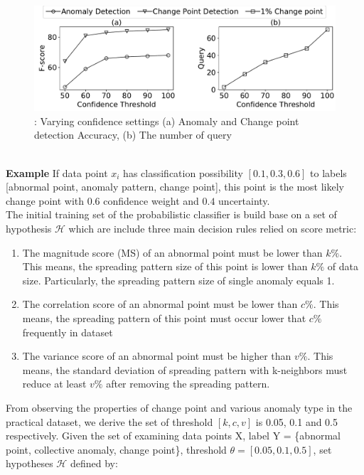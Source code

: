 \begin{figure}[h]
	\centering
	\includegraphics[width=\textwidth]{Part3/Chapter7/figures/new_compare_confidence.pdf}
	\caption{ : Varying confidence settings (a) Anomaly and Change point detection Accuracy, (b) The number of query}
	\label{fig:compare}
\end{figure}
\\
\textbf{Example } If data point $ x_i $ has classification possibility $ [0.1, 0.3, 0.6] $ to labels [abnormal point, anomaly pattern, change point], this point is the most likely change point with 0.6 confidence weight and $ 0.4 $ uncertainty. \\

The initial training set of the probabilistic classifier is build base on a set of hypothesis  $ \mathcal{H} $ which are include three main decision rules relied on score metric:

\begin{enumerate}
	\item The magnitude score (MS) of an abnormal point must be lower than $ k\% $. This means, the spreading pattern size of this point is lower than $ k\% $ of data size. Particularly, the spreading pattern size of single anomaly equals 1. 
	\item The correlation score of an abnormal point must be lower than $ c\% $. This means, the spreading pattern of this point must occur lower that $ c\% $ frequently in dataset
	\item The variance score of an abnormal point must be higher than $ v\% $. This means, the standard deviation of spreading pattern with k-neighbors must reduce at least $ v\% $ after removing the spreading pattern.
\end{enumerate}

From observing the properties of change point and various anomaly type in the practical dataset, we derive the set of threshold $ [k,c,v] $ is 0.05, 0.1 and 0.5 respectively. Given the set of examining data points X, label Y = \{abnormal point, collective anomaly, change point\}, threshold $ \theta =  [0.05, 0.1, 0.5]$, set hypotheses $ \mathcal{H} $ defined by:

